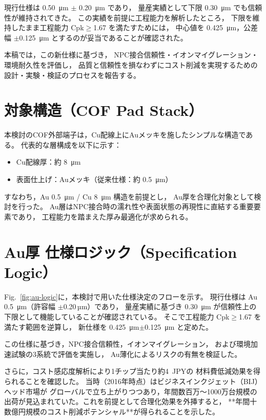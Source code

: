 \documentclass[conference]{IEEEtran}
\begin{document}
現行仕様は \SI{0.50}{\micro\meter} $\pm$ \SI{0.20}{\micro\meter} であり，
量産実績として下限 \SI{0.30}{\micro\meter} でも信頼性が維持されてきた。
この実績を前提に工程能力を解析したところ，
下限を維持したまま工程能力 Cpk$\geq$1.67 を満たすためには，
中心値を \SI{0.425}{\micro\meter}，公差幅 $\pm$\SI{0.125}{\micro\meter} とするのが妥当であることが確認された。

本稿では，この新仕様に基づき，
NPC接合信頼性・イオンマイグレーション・環境耐久性を評価し，
品質と信頼性を損なわずにコスト削減を実現するための
設計・実験・検証のプロセスを報告する。

\section{対象構造（COF Pad Stack）}
本検討のCOF外部端子は，Cu配線上にAuメッキを施したシンプルな構造である。
代表的な層構成を以下に示す：

\begin{itemize}
  \item Cu配線厚：約 \SI{8}{\micro\meter}
  \item 表面仕上げ：Auメッキ（従来仕様：約 \SI{0.5}{\micro\meter}）
\end{itemize}

すなわち，Au \SI{0.5}{\micro\meter} / Cu \SI{8}{\micro\meter} 構造を前提とし，
Au厚を合理化対象として検討を行った。  
Au層はNPC接合時の濡れ性や表面状態の再現性に直結する重要要素であり，
工程能力を踏まえた厚み最適化が求められる。

\section{Au厚 仕様ロジック（Specification Logic）}
Fig.~\ref{fig:au-logic}に，本検討で用いた仕様決定のフローを示す。
現行仕様は Au \SI{0.5}{\micro\meter}（許容幅 $\pm$0.20\,µm）であり，
量産実績に基づき \SI{0.30}{\micro\meter} が信頼性上の下限として機能していることが確認されている。
そこで工程能力 Cpk$\geq$1.67 を満たす範囲を逆算し，
新仕様を \SI{0.425}{\micro\meter}$\pm$\SI{0.125}{\micro\meter} と定めた。

この仕様に基づき，NPC接合信頼性，イオンマイグレーション，
および環境加速試験の3系統で評価を実施し，
Au薄化によるリスクの有無を検証した。

さらに，コスト感応度解析により1チップ当たり約\SI{4}{JPY}の
材料費低減効果を得られることを確認した。
当時（2016年時点）はビジネスインクジェット（BIJ）ヘッド市場が
グローバルで立ち上がりつつあり，年間数百万〜1000万台規模の
出荷が見込まれていた。これを前提として合理化効果を外挿すると，
**年間十数億円規模のコスト削減ポテンシャル**が得られることを示した。
\end{document}
